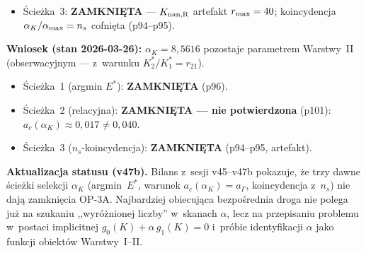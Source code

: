 \begin{problem}
\begin{itemize}[nosep]
    \medskip
    \emph{Odkrycia p101}:
    \begin{itemize}[nosep]
      \item \textbf{Universalno\'s\'c $\psi_0$}:
        $\psi_0(K^*_1) = 1{,}2419 = \mathrm{const}$%
        \footnote{Warto\'s\'c kanoniczna: $g_0^e = 0{,}86941$ (Formulacja~A, $K = g^4$). Warto\'s\'c $1{,}24$ odpowiada Formulacji~B ($f = 1+4\ln g$).}
        dla wszystkich $a_\Gamma\in[0{,}010;\,0{,}060]$ ---
        warto\'s\'c pocz\k{a}tkowa solitonu nie zale\.zy od $a_\Gamma$!
      \item $K^*_1 \propto a_\Gamma$ (skalowanie Schwarzschilda,
        odch.\ $\leq 3{,}3\%$ bias $r_{\rm max}=80$);
      \item $K^*_2$ (ga\l{}\k{a}\'z $\psi_0\approx4{,}1$) \textbf{nie istnieje}
        dla $a_\Gamma \leq 0{,}015$~--- krytyczna warto\'s\'c
        $a_c \in (0{,}015;\,0{,}020]$;
      \item $K^*_2/K^*_1 \approx 16{,}7$ (sta\l{}e dla $a_\Gamma\in[0{,}020;\,0{,}060]$,
        oba $\propto a_\Gamma$);
      \item $a_c \approx 0{,}017 \neq 0{,}040 = a_\Gamma^{\rm phys}$~---
        \textbf{warunek $a_c(\alpha_K) = a_\Gamma$ nie spe\l{}niony}.
    \end{itemize}
    \textbf{Wniosek}: OP-3 \'Scie\.zka~2 nie jest potwierdzona
    w~zakresie dostepno\'sci numerycznej.
    Uwaga: $K^*_2$ z~p101 ($\psi_0\approx4{,}1$) i~z~p99 ($\psi_0\approx5{,}0$)
    to \emph{r\'o\.zne} ga\l{}\k{e}zie solitonu;
    bogaty spektrum wzbudze\'n $K^*_n$ wymaga dalszej identyfikacji.
  \item \'Scie\.zka~3: \textbf{ZAMKNI\k{E}TA} --- $K_{\rm nan,R}$ artefakt
    $r_{\rm max}=40$; koincydencja $\alpha_K/\alpha_{\rm max}=n_s$ cofni\k{e}ta (p94--p95).
\end{itemize}
\textbf{Wniosek (stan 2026-03-26):} $\alpha_K = 8{,}5616$ pozostaje parametrem
Warstwy~II (obserwacyjnym --- z~warunku $K^*_2/K^*_1 = r_{21}$).
\begin{itemize}[nosep]
  \item \'Scie\.zka~1 (argmin $E^*$): \textbf{ZAMKNI\k{E}TA} (p96).
  \item \'Scie\.zka~2 (relacyjna): \textbf{ZAMKNI\k{E}TA --- nie potwierdzona} (p101):
    $a_c(\alpha_K)\approx0{,}017 \neq 0{,}040$.
  \item \'Scie\.zka~3 ($n_s$-koincydencja): \textbf{ZAMKNI\k{E}TA} (p94--p95, artefakt).
\end{itemize}
\textbf{Aktualizacja statusu (v47b).}
Bilans z~sesji v45--v47b pokazuje, \.ze trzy dawne \'scie\.zki selekcji
$\alpha_K$ (argmin~$E^*$, warunek $a_c(\alpha_K)=a_\Gamma$,
koincydencja z~$n_s$) nie daj\k{a} zamkni\k{e}cia OP-3A.
Najbardziej obiecuj\k{a}ca bezpo\'srednia droga nie polega ju\.z na
szukaniu ,,wyr\'o\.znionej liczby'' w~skanach $\alpha$, lecz na
przepisaniu problemu w~postaci implicitnej
$g_0(K)+\alpha\,g_1(K)=0$ i~pr\'obie identyfikacji $\alpha$ jako funkcji
obiekt\'ow Warstwy~I--II.


\end{problem}
